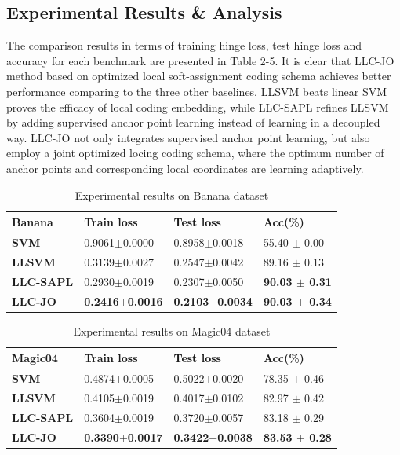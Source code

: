 \documentclass{llncs}
\begin{document}
	\subsection{Experimental Results \& Analysis}
	The comparison results in terms of training hinge loss, test hinge loss and accuracy for each benchmark are presented in Table 2-5.
	It is clear that LLC-JO method based on optimized local soft-assignment coding schema achieves better performance comparing to the three other baselines. LLSVM beats linear SVM proves the efficacy of local coding embedding, while LLC-SAPL refines LLSVM by adding supervised anchor point learning instead of learning in a decoupled way. LLC-JO not only integrates supervised anchor point learning, but also employ a joint optimized locing coding schema, where the optimum number of anchor points and corresponding local coordinates are learning adaptively.
	
	
	\begin{table}
		\begin{tabu} to \textwidth {|X[c]| X[c]| X[c]| X[c]|}
			\hline
			Banana              & Train loss & Test loss & Acc(\%) \\
			\hline
			\textbf{SVM} 		   	&0.9061$\pm$0.0000  &0.8958$\pm$0.0018  & 55.40 $\pm$ 0.00   \\ \hline
			\textbf{LLSVM}     		&0.3139$\pm$0.0027  &0.2547$\pm$0.0042  & 89.16 $\pm$ 0.13   \\ \hline
			\textbf{LLC-SAPL}       &0.2930$\pm$0.0019  &0.2307$\pm$0.0050  & \textbf{90.03 $\pm$ 0.31}  \\ \hline
			\textbf{LLC-JO}         &\textbf{0.2416$\pm$0.0016}  &\textbf{0.2103$\pm$0.0034}  & \textbf{90.03 $\pm$ 0.34}  \\ \hline
		\end{tabu}
		\caption{Experimental results on Banana dataset}
	\end{table}

	\begin{table}
		\begin{tabu} to \textwidth {|X[c]| X[c]| X[c]| X[c]|}
			\hline
			Magic04              & Train loss & Test loss & Acc(\%) \\
			\hline
			\textbf{SVM} 		   	&0.4874$\pm$0.0005  &0.5022$\pm$0.0020  &78.35 $\pm$ 0.46   \\ \hline
			\textbf{LLSVM}     		&0.4105$\pm$0.0019  &0.4017$\pm$0.0102  &82.97 $\pm$ 0.42   \\ \hline
			\textbf{LLC-SAPL}       &0.3604$\pm$0.0019  &0.3720$\pm$0.0057  &83.18 $\pm$ 0.29   \\ \hline
			\textbf{LLC-JO}         &\textbf{0.3390$\pm$0.0017}  &\textbf{0.3422$\pm$0.0038}  &\textbf{83.53 $\pm$ 0.28}   \\ \hline
		\end{tabu}
		\caption{Experimental results on Magic04 dataset}
	\end{table}
\end{document}
